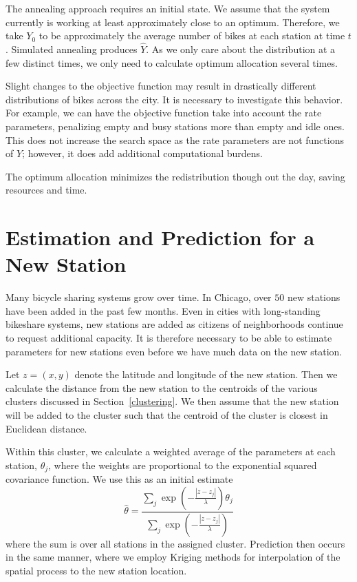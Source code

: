 \documentclass{acm_proc_article-sp}
\begin{document}
The annealing approach requires an initial state.  We assume that the system currently is working at least approximately close to an optimum.  Therefore, we take $Y_0$ to be approximately the average number of bikes at each station at time $t$.  Simulated annealing produces $\hat{Y}$.  As we only care about the distribution at a few distinct times, we only need to calculate optimum allocation several times. 

Slight changes to the objective function may result in drastically different distributions of bikes across the city.  It is necessary to investigate this behavior.  For example, we can have the objective function take into account the rate parameters, penalizing empty and busy stations more than empty and idle ones.  This does not increase the search space as the rate parameters are not functions of $Y$; however, it does add additional computational burdens. 

The optimum allocation minimizes the redistribution though out the day, saving resources and time.

\newpage 

\section{Estimation and Prediction for a New Station} \label{newstation}

Many bicycle sharing systems grow over time.  In Chicago, over $50$ new stations have been added in the past few months.  Even in cities with long-standing bikeshare systems, new stations are added as citizens of neighborhoods continue to request additional capacity.  It is therefore necessary to be able to estimate parameters for new stations even before we have much data on the new station.

Let $z=(x,y)$ denote the latitude and longitude of the new station.  Then we calculate the distance from the new station to the centroids of the various clusters discussed in Section~\ref{clustering}.  We then assume that the new station will be added to the cluster such that the centroid of the cluster is closest in Euclidean distance.

Within this cluster, we calculate a weighted average of the parameters at each station, $\theta_j$, where the weights are proportional to the exponential squared covariance function.  We use this as an initial estimate 
\begin{equation}
\hat{\theta} = \frac{\sum_j \exp \left( - \frac{ |z - z_j|}{\lambda} \right) \theta_j}{\sum_j \exp \left( - \frac{ |z - z_j|}{\lambda} \right) }
\end{equation}
\noindent where the sum is over all stations in the assigned cluster.  Prediction then occurs in the same manner, where we employ Kriging methods for interpolation of the spatial process to the new station location.
\end{document}
